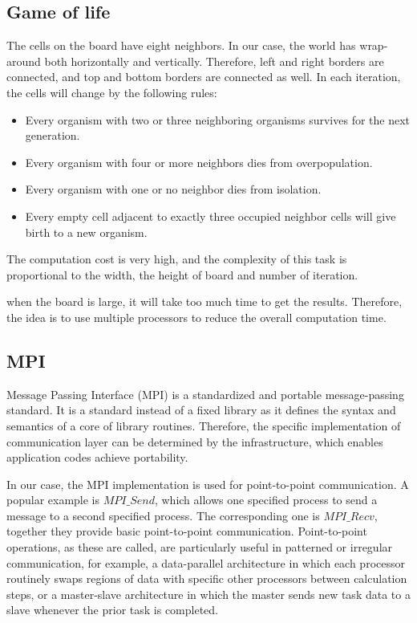 \documentclass[sigchi]{acmart}
\begin{document}
\subsection{Game of life}
The cells on the board have eight neighbors. In our case, the world has wrap-around both horizontally and vertically. 
Therefore, left and right borders are connected, and top and bottom borders are connected as well.
In each iteration, the cells will change by the following rules:
\begin{itemize}
    \item Every organism with two or three neighboring organisms survives for the next generation.
    \item Every organism with four or more neighbors dies from overpopulation.
    \item Every organism with one or no neighbor dies from isolation.
    \item Every empty cell adjacent to exactly three occupied neighbor cells will give birth to a new organism. 
\end{itemize}

The computation cost is very high, and the complexity of this task is proportional to the width, the height of board and number of iteration.

when the board is large, it will take too much time to get the results. Therefore, the idea is to use multiple processors to reduce the overall computation time.
\subsection{MPI}
Message Passing Interface (MPI) is a standardized and portable message-passing standard. 
It is a standard instead of a fixed library as it defines the syntax and semantics of a core of library routines.
Therefore, the specific implementation of communication layer can be determined by the infrastructure, which enables application codes achieve portability.

In our case, the MPI implementation is used for point-to-point communication. 
A popular example is $MPI\_Send$, which allows one specified process to send a message to a second specified process. 
The corresponding one is $MPI\_Recv$, together they provide basic point-to-point communication.
Point-to-point operations, as these are called, are particularly useful in patterned or irregular communication, for example, a data-parallel architecture in which each processor routinely swaps regions of data with specific other processors between calculation steps, or a master-slave architecture in which the master sends new task data to a slave whenever the prior task is completed.
\end{document}
